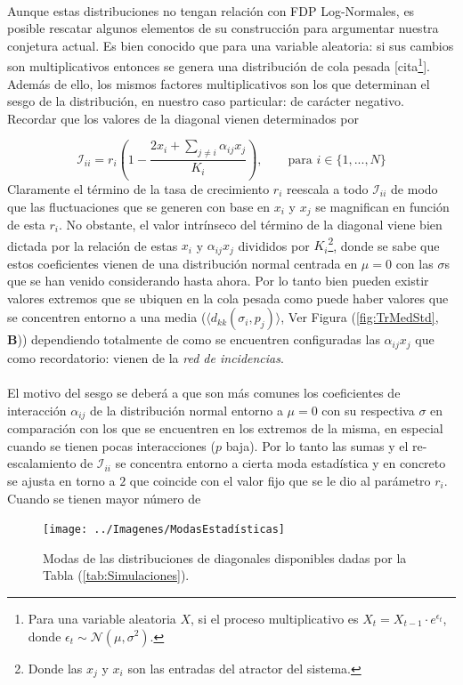 \documentclass[a4paper,11pt]{book}
\theoremstyle{plain}
\theoremstyle{definition}
\begin{document}
\\
Aunque estas distribuciones no tengan relación con FDP Log-Normales, es posible rescatar algunos elementos de su construcción para argumentar nuestra conjetura actual. Es bien conocido que para una variable aleatoria: si sus cambios son multiplicativos entonces se genera una distribución de cola pesada [cita\footnote{Para una variable aleatoria $X$, si el proceso multiplicativo es $X_t=X_{t-1}\cdot e	^{\epsilon_t}$, donde $\epsilon_t\sim \mathcal{N}(\mu,\sigma^2)$.}]. Además de ello, los mismos factores multiplicativos son los que determinan el sesgo de la distribución, en nuestro caso particular: de carácter negativo. Recordar que los valores de la diagonal vienen determinados por

$$\mathcal{I}_{ii} = r_i \left (1-\frac{2x_i+\sum_{j\neq i}\alpha_{ij}x_j}{K_i}\right ),\qquad\text{para }i\in\{1,...,N\}$$
\newpage
Claramente el término de la tasa de crecimiento $r_i$ reescala a todo $\mathcal{I}_{ii}$ de modo que las fluctuaciones que se generen con base en $x_i$ y $x_j$ se magnifican en función de esta $r_i$. No obstante, el valor intrínseco del término de la diagonal viene bien dictada por la relación de estas $x_i$ y $\alpha_{ij}x_j$ divididos por $K_i$\footnote{Donde las $x_j$ y $x_i$ son las entradas del atractor del sistema.}, donde se sabe que estos coeficientes vienen de una distribución normal centrada en $\mu=0$ con las $\sigma$s que se han venido considerando hasta ahora. Por lo tanto bien pueden existir valores extremos que se ubiquen en la cola pesada como puede haber valores que se concentren entorno a una media ($\langle d_{kk}(\sigma_i,p_j)\rangle$, Ver Figura (\ref{fig:TrMedStd}, \textbf{B})) dependiendo totalmente de como se encuentren configuradas las $\alpha_{ij}x_j$ que como recordatorio: vienen de la \textit{red de incidencias}. \\
\\
El motivo del sesgo se deberá a que son más comunes los coeficientes de interacción $\alpha_{ij}$ de la distribución normal entorno a $\mu=0$ con su respectiva $\sigma$ en comparación con los que se encuentren en los extremos de la misma, en especial cuando se tienen pocas interacciones ($p$ baja). Por lo tanto las sumas y el re-escalamiento de $\mathcal{I}_{ii}$ se concentra entorno a cierta moda estadística y en concreto	se ajusta en torno a $2$ que coincide con el valor fijo que se le dio al parámetro $r_i$. Cuando se tienen mayor número de 
\begin{figure} \vspace{-30pt} \begin{center}
		\texttt{[image: ../Imagenes/ModasEstadísticas]}
	\end{center}
	\vspace{-20pt} 
	\caption{Modas de las distribuciones de diagonales disponibles dadas por la Tabla (\ref{tab:Simulaciones}).}
	\vspace{-10pt}
	\label{fig:ModasEstadísticas}
\end{figure}
\end{document}
